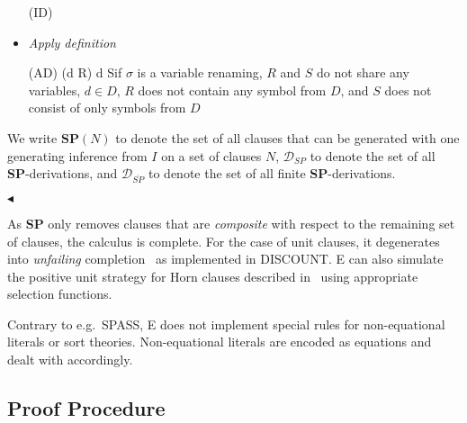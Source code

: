\documentclass{article}
\begin{document}
\begin{definition}
\begin{itemize}
  \bigskip (ID) 

\item \emph{Apply definition}

  \bigskip (AD) 
  {\sigma(d \vee R) \phantom{ae} \neg d \vee S}{if $\sigma$ is a
    variable renaming, $R$ and $S$ do not share
    any variables, $d \in D$, $R$ does not contain any symbol from
    $D$, and $S$ does not consist of only symbols from $D$}

   
 \end{itemize}
 We write $\mathbf{SP}(N)$ to denote the set of all clauses that can
 be generated with one generating inference from $I$ on a set of
 clauses $N$, $\mathcal{D}_{SP}$ to denote the set of all
 \textbf{SP}-derivations, and $\mathcal{D}_{\overline{SP}}$ to denote
  the set of all finite \textbf{SP}-derivations.
  
  \hfill$\blacktriangleleft$
\end{definition}



As \textbf{SP} only removes clauses that are \emph{composite} with
respect to the remaining set of clauses, the calculus is complete. For
the case of unit clauses, it degenerates into \emph{unfailing}
completion~\cite{BDP89} as implemented in DISCOUNT. E
can also simulate the positive unit strategy for Horn clauses
described in~\cite{Dershowitz:IJCAI-91} using appropriate selection
functions.

Contrary to e.g.\ SPASS, E does not implement special
rules for non-equa\-tio\-nal literals or sort theories. Non-equational
literals are encoded as equations and dealt with accordingly.



\subsection{Proof Procedure}
\label{sec:procedure}
\end{document}
